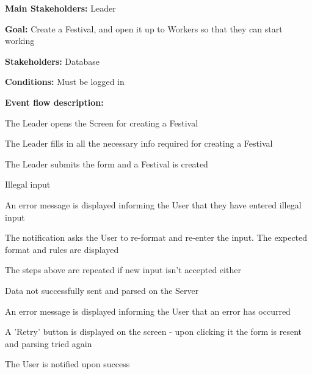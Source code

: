 				\noindent {}
				\begin{packed_item}
					\item \textbf{Main Stakeholders:} Leader
					\item \textbf{Goal:} Create a Festival, and open it up to Workers so that they can start working
					\item \textbf{Stakeholders:} Database
					\item \textbf{Conditions:} Must be logged in
					\item \textbf{Event flow description: }
					\begin{packed_enum}
						\item The Leader opens the Screen for creating a Festival
						\item The Leader fills in all the necessary info required for creating a Festival
						\item The Leader submits the form and a Festival is created
					\end{packed_enum}
					
					\begin{packed_item}
						\item[2.a] Illegal input
						\item[] \begin{packed_enum}
							\item An error message is displayed informing the User that they have entered illegal input
							\item The notification asks the User to re-format and re-enter the input. The expected format and rules are displayed
							\item The steps above are repeated if new input isn't accepted either
						\end{packed_enum}
						
						\item[3.a] Data not successfully sent and parsed on the Server
						\item[] \begin{packed_enum}
							\item An error message is displayed informing the User that an error has occurred
							\item A 'Retry' button is displayed on the screen - upon clicking it the form is resent and parsing tried again
							\item The User is notified upon success
						\end{packed_enum}
					
					\end{packed_item}
				\end{packed_item}
					
